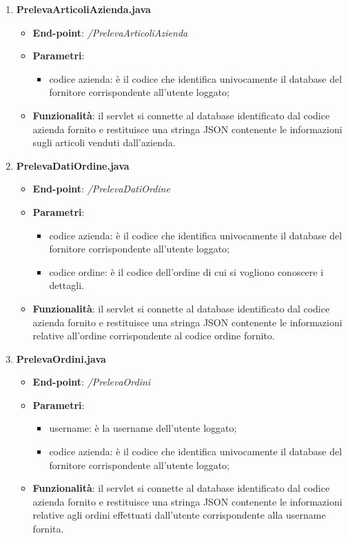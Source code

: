\documentclass[12pt, a4paper, titlepage]{report}
\begin{document}
\begin{enumerate}
		\item \textbf{PrelevaArticoliAzienda.java}
		\begin{itemize}
			\item \textbf{End-point}: \textit{/PrelevaArticoliAzienda}
			\item \textbf{Parametri}:
			\begin{itemize}
				\item codice azienda: è il codice che identifica univocamente il database del fornitore corrispondente all'utente loggato;
			\end{itemize}
			\item \textbf{Funzionalità}: il servlet si connette al database identificato dal codice azienda fornito e restituisce una stringa JSON contenente le informazioni sugli articoli venduti dall'azienda.
		\end{itemize}
	
		\item \textbf{PrelevaDatiOrdine.java}
		\begin{itemize}
			\item \textbf{End-point}: \textit{/PrelevaDatiOrdine}
			\item \textbf{Parametri}:
			\begin{itemize}
				\item codice azienda: è il codice che identifica univocamente il database del fornitore corrispondente all'utente loggato;
				\item codice ordine: è il codice dell'ordine di cui si vogliono conoscere i dettagli.
			\end{itemize}
			\item \textbf{Funzionalità}: il servlet si connette al database identificato dal codice azienda fornito e restituisce una stringa JSON contenente le informazioni relative all'ordine corrispondente al codice ordine fornito.
		\end{itemize}
	
		\item \textbf{PrelevaOrdini.java}
		\begin{itemize}
			\item \textbf{End-point}: \textit{/PrelevaOrdini}
			\item \textbf{Parametri}:
			\begin{itemize}
				\item username: è la username dell'utente loggato;
				\item codice azienda: è il codice che identifica univocamente il database del fornitore corrispondente all'utente loggato;
			\end{itemize}
			\item \textbf{Funzionalità}: il servlet si connette al database identificato dal codice azienda fornito e restituisce una stringa JSON contenente le informazioni relative agli ordini effettuati dall'utente corrispondente alla username fornita.
		\end{itemize}
	

\end{enumerate}
\end{document}
